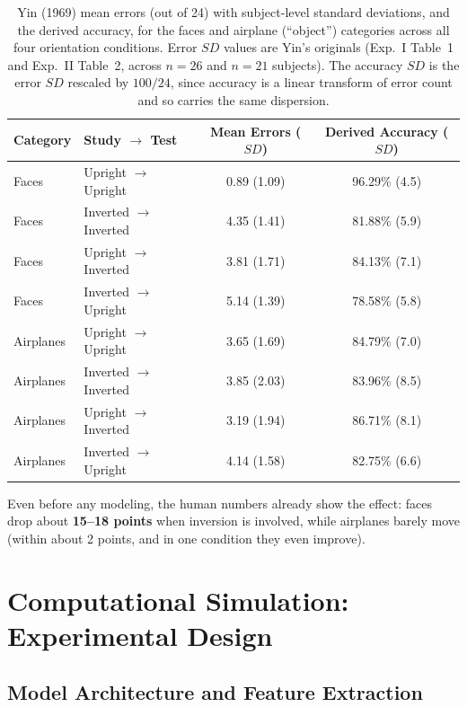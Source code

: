 \documentclass[11pt]{article}
\begin{document}
\begin{table}[h]
\centering
\caption{Yin (1969) mean errors (out of 24) with subject-level standard deviations, and the
derived accuracy, for the faces and airplane (``object'') categories across all four orientation
conditions. Error $SD$ values are Yin's originals (Exp.~I Table~1 and Exp.~II Table~2, across
$n=26$ and $n=21$ subjects). The accuracy $SD$ is the error $SD$ rescaled by $100/24$, since
accuracy is a linear transform of error count and so carries the same dispersion.}
\label{tab:human}
\begin{tabular}{llcc}
\toprule
Category & Study $\rightarrow$ Test & Mean Errors ($SD$) & Derived Accuracy ($SD$) \\
\midrule
Faces     & Upright $\rightarrow$ Upright   & 0.89 (1.09) & 96.29\% (4.5) \\
Faces     & Inverted $\rightarrow$ Inverted & 4.35 (1.41) & 81.88\% (5.9) \\
Faces     & Upright $\rightarrow$ Inverted  & 3.81 (1.71) & 84.13\% (7.1) \\
Faces     & Inverted $\rightarrow$ Upright  & 5.14 (1.39) & 78.58\% (5.8) \\
\midrule
Airplanes & Upright $\rightarrow$ Upright   & 3.65 (1.69) & 84.79\% (7.0) \\
Airplanes & Inverted $\rightarrow$ Inverted & 3.85 (2.03) & 83.96\% (8.5) \\
Airplanes & Upright $\rightarrow$ Inverted  & 3.19 (1.94) & 86.71\% (8.1) \\
Airplanes & Inverted $\rightarrow$ Upright  & 4.14 (1.58) & 82.75\% (6.6) \\
\bottomrule
\end{tabular}
\end{table}

Even before any modeling, the human numbers already show the effect: faces drop about
\textbf{15--18 points} when inversion is involved, while airplanes barely move (within about
2 points, and in one condition they even improve).

\section{Computational Simulation: Experimental Design}

\subsection{Model Architecture and Feature Extraction}
\end{document}
